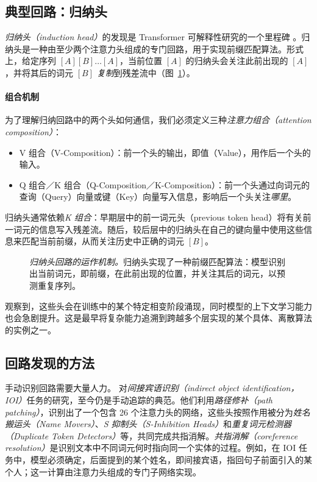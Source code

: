 \subsection{典型回路：归纳头}
\emph{归纳头（induction head）}的发现是 Transformer 可解释性研究的一个里程碑 \citep{olsson2022context}。归纳头是一种由至少两个注意力头组成的专门回路，用于实现前缀匹配算法。形式上，给定序列 $[A][B] \dots [A]$，当前位置 $[A]$ 的归纳头会关注此前出现的 $[A]$，并将其后的词元 $[B]$ \emph{复制}到残差流中（图~\ref{fig:induction_head}）。

\paragraph{组合机制}
为了理解归纳回路中的两个头如何通信，我们必须定义三种\emph{注意力组合（attention composition）}\citep{elhage2021mathematical}：
\begin{itemize}
    \item V 组合（V-Composition）：前一个头的输出，即值（Value），用作后一个头的输入。
    \item Q 组合／K 组合（Q-Composition／K-Composition）：前一个头通过向词元的查询（Query）向量或键（Key）向量写入信息，影响后一个头关注\emph{哪里}。
\end{itemize}
归纳头通常依赖\emph{K 组合}：早期层中的前一词元头（previous token head）将有关前一词元的信息写入残差流。随后，较后层中的归纳头在自己的键向量中使用这些信息来匹配当前前缀，从而关注历史中正确的词元 $[B]$。

\begin{figure}[htbp]
    \centering
    
    \caption{\emph{归纳头回路的运作机制。}归纳头实现了一种前缀匹配算法：模型识别出当前词元，即前缀，在此前出现的位置，并关注其后的词元，以预测重复序列。
    \label{fig:induction_head} }
\end{figure}

\citet{olsson2022context} 观察到，这些头会在训练中的某个特定相变阶段涌现，同时模型的上下文学习能力也会急剧提升。这是最早将复杂能力追溯到跨越多个层实现的某个具体、离散算法的实例之一。

\subsection{回路发现的方法}
手动识别回路需要大量人力。\citet{wang2022interpretability} 对\emph{间接宾语识别（indirect object identification，IOI）}任务的研究，至今仍是手动追踪的典范。他们利用\emph{路径修补（path patching）}，识别出了一个包含 26 个注意力头的网络，这些头按照作用被分为{\em 姓名搬运头（Name Movers）}、{\em S 抑制头（S-Inhibition Heads）}和{\em 重复词元检测器（Duplicate Token Detectors）}等，共同完成共指消解。\emph{共指消解（coreference resolution）}是识别文本中不同词元何时指向同一个实体的过程。例如，在 IOI 任务中，模型必须确定，后面提到的某个姓名，即间接宾语，指回句子前面引入的某个人；这一计算由注意力头组成的专门子网络实现。

